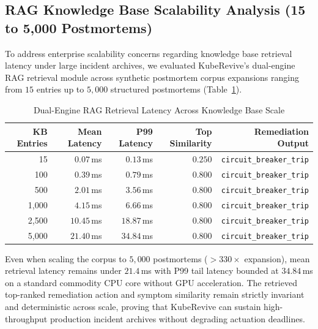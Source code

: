 \documentclass[conference]{IEEEtran}
\begin{document}
\subsection{RAG Knowledge Base Scalability Analysis (15 to 5,000 Postmortems)}
To address enterprise scalability concerns regarding knowledge base retrieval latency under large incident archives, we evaluated KubeRevive's dual-engine RAG retrieval module across synthetic postmortem corpus expansions ranging from $15$ entries up to $5,000$ structured postmortems (Table~\ref{tab:rag_scale}).

\begin{table}[h]
\centering
\caption{Dual-Engine RAG Retrieval Latency Across Knowledge Base Scale}
\label{tab:rag_scale}
\begin{tabular}{@{}rrrrr@{}}
\toprule
\textbf{KB Entries} & \textbf{Mean Latency} & \textbf{P99 Latency} & \textbf{Top Similarity} & \textbf{Remediation Output} \\
\midrule
15 & $0.07$\,ms & $0.13$\,ms & $0.250$ & \texttt{circuit\_breaker\_trip} \\
100 & $0.39$\,ms & $0.79$\,ms & $0.800$ & \texttt{circuit\_breaker\_trip} \\
500 & $2.01$\,ms & $3.56$\,ms & $0.800$ & \texttt{circuit\_breaker\_trip} \\
1,000 & $4.15$\,ms & $6.66$\,ms & $0.800$ & \texttt{circuit\_breaker\_trip} \\
2,500 & $10.45$\,ms & $18.87$\,ms & $0.800$ & \texttt{circuit\_breaker\_trip} \\
5,000 & $21.40$\,ms & $34.84$\,ms & $0.800$ & \texttt{circuit\_breaker\_trip} \\
\bottomrule
\end{tabular}
\end{table}

Even when scaling the corpus to $5,000$ postmortems ($>330\times$ expansion), mean retrieval latency remains under $21.4$\,ms with P99 tail latency bounded at $34.84$\,ms on a standard commodity CPU core without GPU acceleration. The retrieved top-ranked remediation action and symptom similarity remain strictly invariant and deterministic across scale, proving that KubeRevive can sustain high-throughput production incident archives without degrading actuation deadlines.
\end{document}
